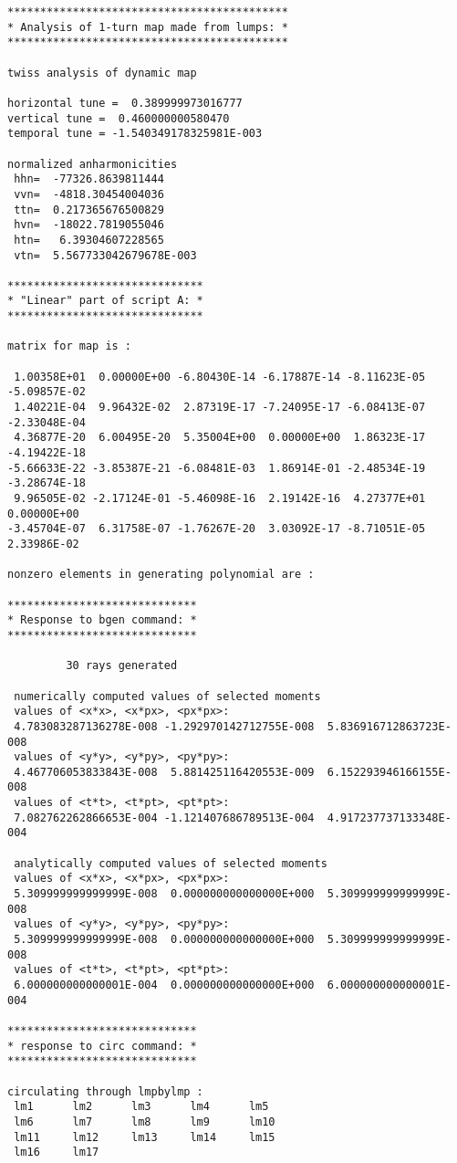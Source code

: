 \begin{footnotesize}
\begin{verbatim}
*******************************************
* Analysis of 1-turn map made from lumps: *
*******************************************

twiss analysis of dynamic map

horizontal tune =  0.389999973016777
vertical tune =  0.460000000580470
temporal tune = -1.540349178325981E-003

normalized anharmonicities
 hhn=  -77326.8639811444
 vvn=  -4818.30454004036
 ttn=  0.217365676500829
 hvn=  -18022.7819055046
 htn=   6.39304607228565
 vtn=  5.567733042679678E-003

******************************
* "Linear" part of script A: *
******************************

matrix for map is :

 1.00358E+01  0.00000E+00 -6.80430E-14 -6.17887E-14 -8.11623E-05 -5.09857E-02
 1.40221E-04  9.96432E-02  2.87319E-17 -7.24095E-17 -6.08413E-07 -2.33048E-04
 4.36877E-20  6.00495E-20  5.35004E+00  0.00000E+00  1.86323E-17 -4.19422E-18
-5.66633E-22 -3.85387E-21 -6.08481E-03  1.86914E-01 -2.48534E-19 -3.28674E-18
 9.96505E-02 -2.17124E-01 -5.46098E-16  2.19142E-16  4.27377E+01  0.00000E+00
-3.45704E-07  6.31758E-07 -1.76267E-20  3.03092E-17 -8.71051E-05  2.33986E-02

nonzero elements in generating polynomial are :

*****************************
* Response to bgen command: *
*****************************

         30 rays generated

 numerically computed values of selected moments
 values of <x*x>, <x*px>, <px*px>:
 4.783083287136278E-008 -1.292970142712755E-008  5.836916712863723E-008
 values of <y*y>, <y*py>, <py*py>:
 4.467706053833843E-008  5.881425116420553E-009  6.152293946166155E-008
 values of <t*t>, <t*pt>, <pt*pt>:
 7.082762262866653E-004 -1.121407686789513E-004  4.917237737133348E-004

 analytically computed values of selected moments
 values of <x*x>, <x*px>, <px*px>:
 5.309999999999999E-008  0.000000000000000E+000  5.309999999999999E-008
 values of <y*y>, <y*py>, <py*py>:
 5.309999999999999E-008  0.000000000000000E+000  5.309999999999999E-008
 values of <t*t>, <t*pt>, <pt*pt>:
 6.000000000000001E-004  0.000000000000000E+000  6.000000000000001E-004

*****************************
* response to circ command: *
*****************************

circulating through lmpbylmp :
 lm1      lm2      lm3      lm4      lm5
 lm6      lm7      lm8      lm9      lm10
 lm11     lm12     lm13     lm14     lm15
 lm16     lm17


\end{verbatim}
\end{footnotesize}
